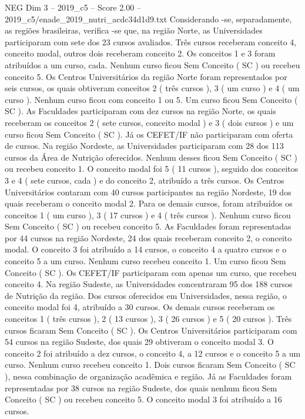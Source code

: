 \begin{textsample}{NEG Dim 3 – 2019\_c5 – Score 2.00 – 2019\_c5/enade\_2019\_nutri\_acdc34d1d9.txt}
Considerando -se, separadamente, as regiões brasileiras, verifica -se que, na região Norte, as Universidades participaram com sete dos 23 cursos avaliados.
Três cursos receberam conceito 4, conceito modal, outros dois receberam conceito 2.
Os conceitos 1 e 3 foram atribuídos a um curso, cada.
Nenhum curso ficou Sem Conceito ( SC ) ou recebeu conceito 5.
Os Centros Universitários da região Norte foram representados por seis cursos, os quais obtiveram conceitos 2 ( três cursos ), 3 ( um curso ) e 4 ( um curso ).
Nenhum curso ficou com conceito 1 ou 5.
Um curso ficou Sem Conceito ( SC ).
As Faculdades participaram com dez cursos na região Norte, os quais receberam os conceitos 2 ( sete cursos, conceito modal ) e 3 ( dois cursos ) e um curso ficou Sem Conceito ( SC ).
Já os CEFET/IF não participaram com oferta de cursos.
Na região Nordeste, as Universidades participaram com 28 dos 113 cursos da Área de Nutrição oferecidos.
Nenhum desses ficou Sem Conceito ( SC ) ou recebeu conceito 1.
O conceito modal foi 5 ( 11 cursos ), seguido dos conceitos 3 e 4 ( sete cursos, cada ) e do conceito 2, atribuído a três cursos.
Os Centros Universitários contaram com 40 cursos participantes na região Nordeste, 19 dos quais receberam o conceito modal 2.
Para os demais cursos, foram atribuídos os conceitos 1 ( um curso ), 3 ( 17 cursos ) e 4 ( três cursos ).
Nenhum curso ficou Sem Conceito ( SC ) ou recebeu conceito 5.
As Faculdades foram representadas por 44 cursos na região Nordeste, 24 dos quais receberam conceito 2, o conceito modal.
O conceito 3 foi atribuído a 14 cursos, o conceito 4 a quatro cursos e o conceito 5 a um curso.
Nenhum curso recebeu conceito 1.
Um curso ficou Sem Conceito ( SC ).
Os CEFET/IF participaram com apenas um curso, que recebeu conceito 4.
Na região Sudeste, as Universidades concentraram 95 dos 188 cursos de Nutrição da região.
Dos cursos oferecidos em Universidades, nessa região, o conceito modal foi 4, atribuído a 30 cursos.
Os demais cursos receberam os conceitos 1 ( três cursos ), 2 ( 13 cursos ), 3 ( 26 cursos ) e 5 ( 20 cursos ).
Três cursos ficaram Sem Conceito ( SC ).
Os Centros Universitários participaram com 54 cursos na região Sudeste, dos quais 29 obtiveram o conceito modal 3.
O conceito 2 foi atribuído a dez cursos, o conceito 4, a 12 cursos e o conceito 5 a um curso.
Nenhum curso recebeu conceito 1.
Dois cursos ficaram Sem Conceito ( SC ), nessa combinação de organização acadêmica e região.
Já as Faculdades foram representadas por 38 cursos na região Sudeste, dos quais nenhum ficou Sem Conceito ( SC ) ou recebeu conceito 5.
O conceito modal 3 foi atribuído a 16 cursos.

\end{textsample}
